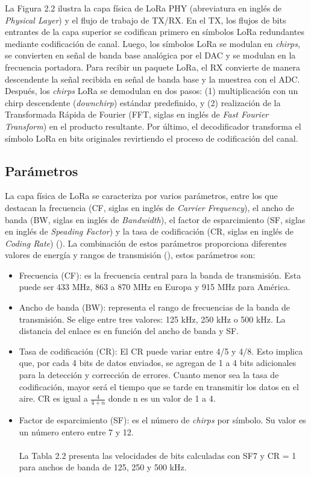 La Figura 2.2 ilustra la capa física de LoRa PHY (abreviatura en inglés de \textit{Physical Layer}) y el flujo de trabajo de TX/RX. En el TX, los flujos de bits entrantes de la capa superior se codifican primero en símbolos LoRa redundantes mediante codificación de canal. Luego, los símbolos LoRa se modulan en \textit{chirps}, se convierten en señal de banda base analógica por el DAC y se modulan en la frecuencia portadora. Para recibir un paquete LoRa, el RX convierte de manera descendente la señal recibida en señal de banda base y la muestrea con el ADC. Después, los \textit{chirps} LoRa se demodulan en dos pasos: (1) multiplicación con un chirp descendente (\textit{downchirp}) estándar predefinido, y (2) realización de la Transformada Rápida de Fourier (FFT, siglas en inglés de \textit{Fast Fourier Transform}) en el producto resultante.  Por último, el decodificador transforma el símbolo LoRa en bits originales revirtiendo el proceso de codificación del canal. 

\subsection{Parámetros}

La capa física de LoRa se caracteriza por varios parámetros, entre los que destacan la frecuencia (CF, siglas en inglés de \textit{Carrier Frequency}), el ancho de banda (BW, siglas en inglés de \textit{Bandwidth}), el factor de esparcimiento (SF, siglas en inglés de \textit{Speading Factor}) y la tasa de codificación (CR, siglas en inglés de \textit{Coding Rate}) (\cite{wang2020}). La combinación de estos parámetros proporciona diferentes valores de energía y rangos de transmisión (\cite{bouguera2018}), estos parámetros son:

\begin{itemize}
   \item Frecuencia (CF): es la frecuencia central para la banda de transmisión. Esta puede ser 433 MHz, 863 a 870 MHz en Europa y 915 MHz para América.
   
   \item Ancho de banda (BW): representa el rango de frecuencias de la banda de transmisión. Se elige entre tres valores: 125 kHz, 250 kHz o 500 kHz. La distancia del enlace es en función del ancho de banda y SF.
   \item Tasa de codificación (CR): El CR puede variar entre 4/5 y 4/8. Esto implica que, por cada 4 bits de datos enviados, se agregan de 1 a 4 bits adicionales para la detección y corrección de errores. Cuanto menor sea la tasa de codificación, mayor será el tiempo que se tarde en transmitir los datos en el aire. CR es igual a $\frac{4}{4 + n}$ donde n es un valor de 1 a 4. 
   \item Factor de esparcimiento (SF): es el número de \textit{chirps} por símbolo. Su valor es un número entero entre 7 y 12.
   \\
   \\
   La Tabla 2.2 presenta las velocidades de bits calculadas con SF7 y CR = 1 para anchos de banda de 125, 250 y 500 kHz.\\

\end{itemize}

